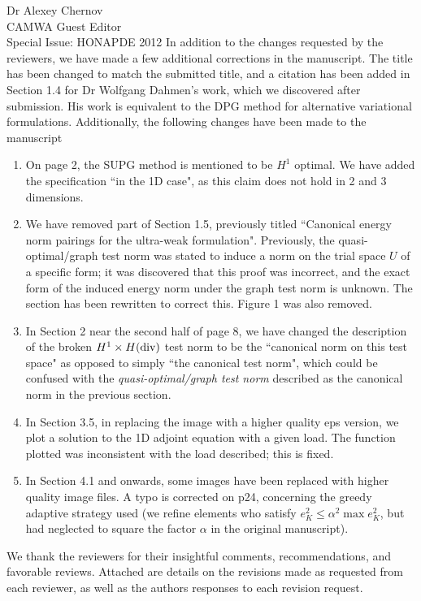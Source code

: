 \documentclass{letter}
\begin{document}
\begin{letter}{Dr Alexey Chernov\\CAMWA Guest Editor\\Special Issue: HONAPDE 2012}
In addition to the changes requested by the reviewers, we have made a few additional corrections in the manuscript.  The title has been changed to match the submitted title, and a citation has been added in Section 1.4 for Dr Wolfgang Dahmen's work, which we discovered after submission.  His work is equivalent to the DPG method for alternative variational formulations.  Additionally, the following changes have been made to the manuscript
\begin{enumerate}
\item On page 2, the SUPG method is mentioned to be $H^1$ optimal.  We have added the specification ``in the 1D case", as this claim does not hold in 2 and 3 dimensions.
\item We have removed part of Section 1.5, previously titled ``Canonical energy norm pairings for the ultra-weak formulation".  Previously, the quasi-optimal/graph test norm was stated to induce a norm on the trial space $U$ of a specific form; it was discovered that this proof was incorrect, and the exact form of the induced energy norm under the graph test norm is unknown.  The section has been rewritten to correct this.  Figure 1 was also removed.  
\item In Section 2 near the second half of page 8, we have changed the description of the broken $H^1\times H({\rm div})$ test norm to be the ``canonical norm on this test space" as opposed to simply ``the canonical test norm", which could be confused with the \textit{quasi-optimal/graph test norm} described as the canonical norm in the previous section.  
\item In Section 3.5, in replacing the image with a higher quality eps version, we plot a solution to the 1D adjoint equation with a given load.  The function plotted was inconsistent with the load described; this is fixed.  
\item In Section 4.1 and onwards, some images have been replaced with higher quality image files.  A typo is corrected on p24, concerning the greedy adaptive strategy used (we refine elements who satisfy $e_K^2 \leq \alpha^2 \max e_K^2$, but had neglected to square the factor $\alpha$ in the original manuscript).  

\end{enumerate}


We thank the reviewers for their insightful comments, recommendations, and favorable reviews.  Attached are details on the revisions made as requested from each reviewer, as well as the authors responses to each revision request.  


\end{letter}
\end{document}

